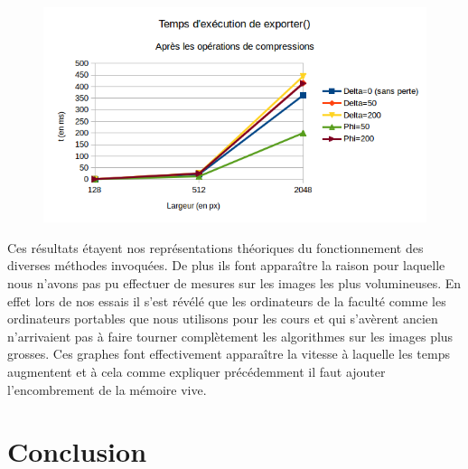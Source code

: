 \documentclass{article}
\begin{document}
	\begin{figure}[H]
		\begin{center}
			\includegraphics[scale=0.5]{grapheExporter}
			\label{grapheExporter}
		\end{center}
	\end{figure}
	Ces résultats étayent nos représentations théoriques du fonctionnement des diverses méthodes invoquées. De plus ils font apparaître la raison pour laquelle nous n'avons pas pu effectuer de mesures sur les images les plus volumineuses. En effet lors de nos essais il s'est révélé que les ordinateurs de la faculté comme les ordinateurs portables que nous utilisons pour les cours et qui s'avèrent ancien n'arrivaient pas à faire tourner complètement les algorithmes sur les images plus grosses. Ces graphes font effectivement apparaître la vitesse à laquelle les temps augmentent et à cela comme expliquer précédemment il faut ajouter l'encombrement de la mémoire vive.
	
	\section{Conclusion}
	
\end{document}
